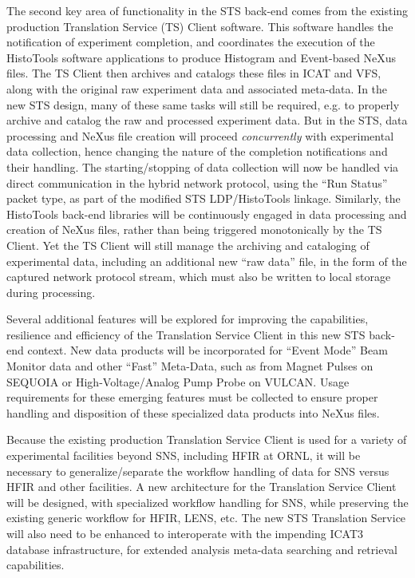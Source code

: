 The second key area of functionality in the STS back-end comes
from the existing production Translation Service (TS) Client software.
This software handles the notification of experiment completion,
and coordinates the execution of the HistoTools software applications
to produce Histogram and Event-based NeXus files.
The TS Client then archives and catalogs these files in ICAT and VFS,
along with the original raw experiment data and associated meta-data.
In the new STS design, many of these same tasks will still be required,
e.g. to properly archive and catalog the raw and processed experiment data.
But in the STS, data processing and NeXus file creation will proceed
{\em concurrently} with experimental data collection,
hence changing the nature of the completion notifications
and their handling.
The starting/stopping of data collection will now be handled
via direct communication in the hybrid network protocol,
using the ``Run Status'' packet type,
as part of the modified STS LDP/HistoTools linkage.
Similarly, the HistoTools back-end libraries will be continuously engaged
in data processing and creation of NeXus files,
rather than being triggered monotonically by the TS Client.
Yet the TS Client will still manage
the archiving and cataloging of experimental data,
including an additional new ``raw data'' file,
in the form of the captured network protocol stream,
which must also be written to local storage during processing.

Several additional features will be explored for improving the
capabilities, resilience and efficiency of the Translation Service Client
in this new STS back-end context.
New data products will be incorporated for ``Event Mode'' Beam Monitor data
and other ``Fast'' Meta-Data,
such as from Magnet Pulses on SEQUOIA
or High-Voltage/Analog Pump Probe on VULCAN.
Usage requirements for these emerging features
must be collected to ensure proper handling
and disposition of these specialized data products into NeXus files.

Because the existing production Translation Service Client
is used for a variety of experimental facilities beyond SNS,
including HFIR at ORNL,
it will be necessary to generalize/separate the workflow handling
of data for SNS versus HFIR and other facilities.
A new architecture for the Translation Service Client
will be designed, with specialized workflow handling for SNS,
while preserving the existing generic workflow for HFIR, LENS, etc.
The new STS Translation Service will also need to be enhanced
to interoperate with the impending ICAT3 database infrastructure,
for extended analysis meta-data searching and retrieval capabilities.

